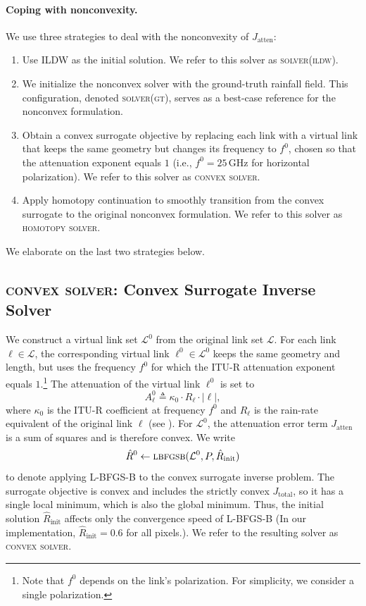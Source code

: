 \documentclass[a4paper,fleqn]{cas-sc}
\DeclareRobustCommand{\solverILDW}{\textsc{solver(ildw)}}
\DeclareRobustCommand{\solverGT}{\textsc{solver(gt)}}
\DeclareRobustCommand{\solverConvex}{\textsc{convex solver}}
\DeclareRobustCommand{\solverHomotopy}{\textsc{homotopy solver}}
\DeclareRobustCommand{\ConvexSolver}{\solverConvex}
\DeclareRobustCommand{\Homotopy}{\solverHomotopy}
\DeclareRobustCommand{\LBFGSB}{\textsc{lbfgsb}}
\begin{document}
\paragraph{Coping with nonconvexity.}
We use three strategies to deal with the nonconvexity of $J_{\mathrm{atten}}$:
\begin{enumerate}
  \item Use ILDW as the initial solution. We refer to this solver as \solverILDW.
  \item We initialize the nonconvex solver with the ground-truth rainfall field. This configuration, denoted \solverGT, serves as a best-case reference for the nonconvex formulation.
  \item Obtain a convex surrogate objective by replacing each link with a virtual link that keeps the same geometry but changes its frequency to $f^0$, chosen so that the attenuation exponent equals $1$ (i.e., $f^0=25\,\si{\giga\hertz}$ for horizontal polarization). We refer to this solver as \ConvexSolver.
  \item Apply homotopy continuation to smoothly transition from the convex surrogate to the original nonconvex formulation. We refer to this solver as \Homotopy.
\end{enumerate}
We elaborate on the last two strategies below.

\subsection{\ConvexSolver: Convex Surrogate Inverse Solver}
We construct a virtual link set $\mathcal{L}^0$ from the original link set $\mathcal{L}$.
For each link $\ell\in\mathcal{L}$, the corresponding virtual link $\ell^0\in\mathcal{L}^0$ keeps the same geometry and length, but uses the frequency $f^0$ for which the ITU-R attenuation exponent equals $1$.\footnote{Note that $f^0$ depends on the link's polarization. For simplicity, we consider a single polarization.}
The attenuation of the virtual link $\ell^0$ is set to
\[
  A^0_{\ell}\triangleq \kappa_0 \cdot R_{\ell}\cdot |\ell|,
\]
where $\kappa_0$ is the ITU-R coefficient at frequency $f^0$ and $R_{\ell}$ is the rain-rate equivalent of the original link $\ell$ (see ).
For $\mathcal{L}^0$, the attenuation error term $J_{\mathrm{atten}}$ is a sum of squares and is therefore convex.
We write
\[
  \hat{R}^0\gets \LBFGSB(\mathcal{L}^0,P,\hat{R}_{\mathrm{init}})
\]
to denote applying L-BFGS-B to the convex surrogate inverse problem.
The surrogate objective is convex and includes the strictly convex $J_{\mathrm{total}}$, so it has a single local minimum, which is also the global minimum.
Thus, the initial solution $\hat{R}_{\mathrm{init}}$ affects only the convergence speed of L-BFGS-B (In our implementation, $\hat{R}_{\mathrm{init}}=0.6$ for all pixels.).
We refer to the resulting solver as \ConvexSolver.
\end{document}

